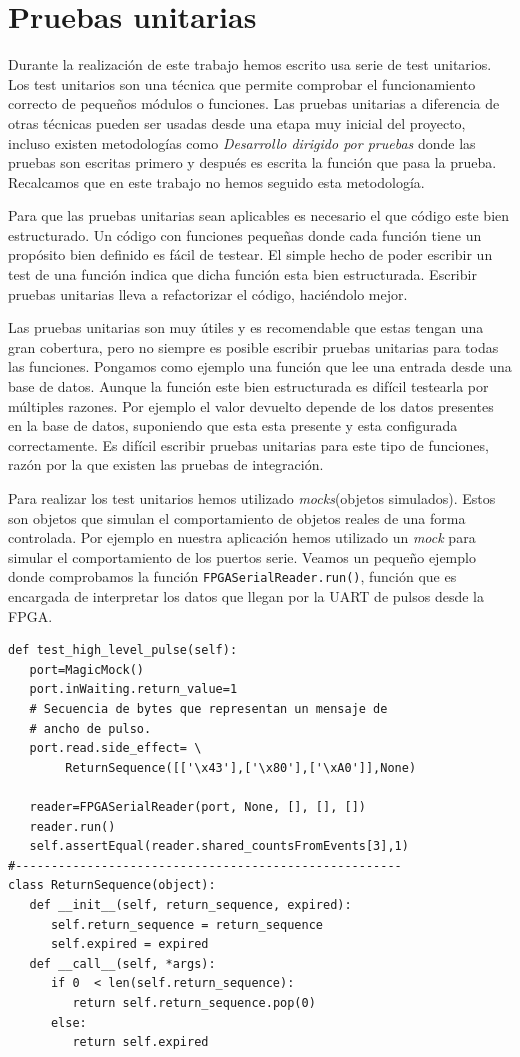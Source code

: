 \section{Pruebas unitarias}
	Durante la realización de este trabajo hemos escrito usa serie de test unitarios\cite{UnitTest}. Los test unitarios son una técnica que
	permite comprobar el funcionamiento correcto de pequeños módulos o funciones. Las pruebas unitarias a diferencia de otras técnicas pueden ser
	usadas desde una etapa muy inicial del proyecto, incluso existen metodologías como \emph{Desarrollo dirigido por pruebas} donde las pruebas
	son escritas primero y después es escrita la función que pasa la prueba. Recalcamos que en este trabajo no hemos seguido esta metodología.
	\par
	Para que las pruebas unitarias sean aplicables es necesario el que código este bien estructurado. Un código con funciones pequeñas donde cada
	función tiene un propósito bien definido es fácil de testear. El simple hecho de poder escribir un test de una función indica que dicha
	función esta bien estructurada. Escribir pruebas unitarias lleva a refactorizar el código, haciéndolo mejor.
	\par
	Las pruebas unitarias son muy útiles y es recomendable que estas tengan una gran cobertura, pero no siempre es posible escribir pruebas
	unitarias para todas las funciones. Pongamos como ejemplo una función que lee una entrada desde una base de datos. Aunque la función este bien
	estructurada es difícil testearla por múltiples razones. Por ejemplo el valor devuelto depende de los datos presentes en la base de datos,
	suponiendo que esta esta presente y esta configurada correctamente. Es difícil escribir pruebas unitarias para este tipo de funciones, razón
	por la que existen las pruebas de integración.
	\par
	Para realizar los test unitarios hemos utilizado \emph{mocks}(objetos simulados). Estos son objetos que simulan el comportamiento de objetos
	reales de una forma controlada. Por ejemplo en nuestra aplicación hemos utilizado un \emph{mock} para simular el comportamiento de los puertos
	serie. Veamos un pequeño ejemplo donde comprobamos la función \texttt{FPGASerialReader.run()}, función que es encargada de interpretar los
	datos que llegan por la UART de pulsos desde la FPGA.
	\begin{lstlisting}[style=myPython]
def test_high_level_pulse(self):
   port=MagicMock()
   port.inWaiting.return_value=1
   # Secuencia de bytes que representan un mensaje de
   # ancho de pulso.
   port.read.side_effect= \
        ReturnSequence([['\x43'],['\x80'],['\xA0']],None)	

   reader=FPGASerialReader(port, None, [], [], [])
   reader.run()
   self.assertEqual(reader.shared_countsFromEvents[3],1)
#------------------------------------------------------
class ReturnSequence(object):
   def __init__(self, return_sequence, expired):
      self.return_sequence = return_sequence
      self.expired = expired
   def __call__(self, *args):
      if 0  < len(self.return_sequence):
         return self.return_sequence.pop(0)
      else:
         return self.expired
	\end{lstlisting}
